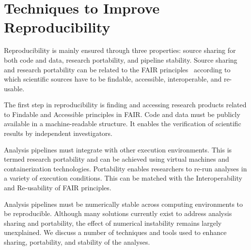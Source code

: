 

\section{Techniques to Improve Reproducibility}
\label{techniques}

Reproducibility is mainly ensured through three properties: 
source sharing for both code and data, 
research portability, and pipeline 
stability. Source sharing and research portability can be related to 
the FAIR principles~\cite{wilkinson2016fair} according to which 
scientific sources have to be findable, accessible, interoperable, and 
re-usable. 

The first step in reproducibility is finding and accessing research products
related to Findable and Accessible principles in FAIR.
Code and data must be publicly available in a 
machine-readable structure. 
It enables the verification of scientific 
results by independent investigators. 

Analysis pipelines must
integrate with other execution environments. This is termed research 
portability and can be achieved using virtual machines and 
containerization technologies. Portability enables researchers to 
re-run analyses in a variety of execution conditions. This can be 
matched with the Interoperability and Re-usability of FAIR principles. 

Analysis pipelines must be numerically stable across
computing environments to be reproducible. Although 
many solutions currently exist to address analysis sharing and 
portability, the effect of numerical instability remains largely 
unexplained. We discuss a number of techniques 
and tools used to enhance sharing, portability, and stability of the 
analyses.


